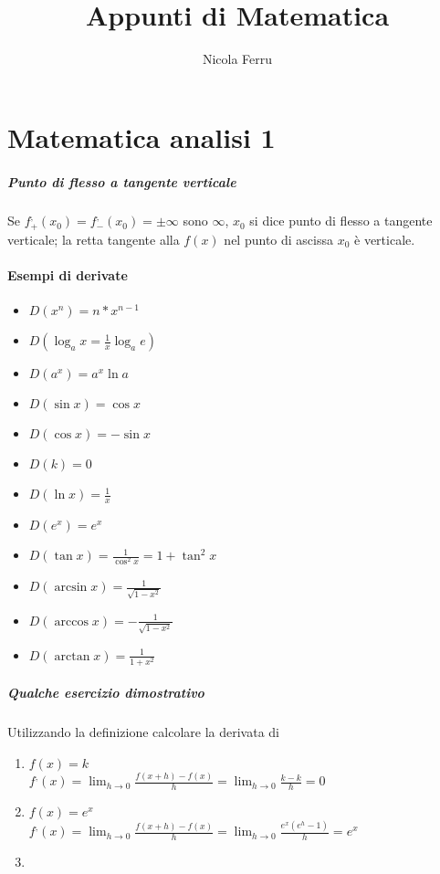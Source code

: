 \documentclass{book}
\title{Appunti di Matematica}
\author{Nicola Ferru}
\date{}
\begin{document}
\maketitle
\tableofcontents
\listoftables
\listoffigures


\part{Matematica analisi 1}



\subsubsection{Punto di flesso a tangente verticale}
Se $f^,_+(x_0)=f^,_-(x_0)=\pm \infty$ sono $\infty$, $x_0$ si dice punto di
flesso a tangente verticale; la retta tangente alla $f(x)$ nel punto di ascissa
$x_0$ è verticale.
\subsection{Esempi di derivate}
\begin{multicols}{2}
	\begin{itemize}
		\item $D(x^n)=n*x^{n-1}$
		\item $D(\log_ax=\frac{1}{x}\log_a e)$
		\item $D(a^x)=a^x\ln a$
		\item $D(\sin x)=\cos x$
		\item $D(\cos x)=-\sin x$
		\item $D(k)=0$
		\item $D(\ln x)=\frac{1}{x}$
		\item $D(e^x)=e^x$
		\item $D(\tan x)=\frac{1}{\cos^2 x}=1+\tan^2x$
		\item $D(\arcsin x)=\frac{1}{\sqrt{1-x^2}}$
		\item $D(\arccos x)=-\frac{1}{\sqrt{1-x^2}}$
		\item $D(\arctan x)=\frac{1}{1+x^2}$
	\end{itemize}
\end{multicols}
\subsubsection{Qualche esercizio dimostrativo}
Utilizzando la definizione calcolare la derivata di
\begin{enumerate}
	\item $f(x)=k$\\
		$f^,(x)=\lim_{h\to 0}\frac{f(x+h)-f(x)}{h}=\lim_{h\to 0}\frac{k-k}{h}=0$
	\item $f(x)=e^x$\\
		$f^,(x)=\lim_{h\to 0}\frac{f(x+h)-f(x)}{h}=\lim_{h\to
		0}\frac{e^x(e^h-1)}{h}=e^x$
	\item 
\end{enumerate}
\end{document}
